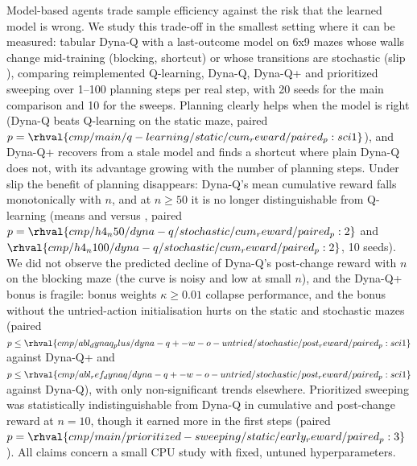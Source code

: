 Model-based agents trade sample efficiency against the risk that the learned model is wrong. We study this trade-off in the smallest setting where it can be measured: tabular Dyna-Q with a last-outcome model on 6x9 mazes whose walls change mid-training (blocking, shortcut) or whose transitions are stochastic (slip ), comparing reimplemented Q-learning, Dyna-Q, Dyna-Q+ and prioritized sweeping over 1--100 planning steps per real step, with 20 seeds for the main comparison and 10 for the sweeps. Planning clearly helps when the model is right (Dyna-Q beats Q-learning on the static maze, paired $p=\rhval{cmp/main/q-learning/static/cum_reward/paired_p:sci1}$), and Dyna-Q+ recovers from a stale model and finds a shortcut where plain Dyna-Q does not, with its advantage growing with the number of planning steps. Under slip  the benefit of planning disappears: Dyna-Q's mean cumulative reward falls monotonically with $n$, and at $n\ge50$ it is no longer distinguishable from Q-learning (means  and  versus , paired $p=\rhval{cmp/h4_n50/dyna-q/stochastic/cum_reward/paired_p:2}$ and $\rhval{cmp/h4_n100/dyna-q/stochastic/cum_reward/paired_p:2}$, 10 seeds). We did not observe the predicted decline of Dyna-Q's post-change reward with $n$ on the blocking maze (the curve is noisy and low at small $n$), and the Dyna-Q+ bonus is fragile: bonus weights $\kappa\ge 0.01$ collapse performance, and the bonus without the untried-action initialisation hurts on the static and stochastic mazes (paired $p\le\rhval{cmp/abl_dynaq_plus/dyna-q+-w-o-untried/stochastic/post_reward/paired_p:sci1}$ against Dyna-Q+ and $p\le\rhval{cmp/abl_ref_dynaq/dyna-q+-w-o-untried/stochastic/post_reward/paired_p:sci1}$ against Dyna-Q), with only non-significant trends elsewhere. Prioritized sweeping was statistically indistinguishable from Dyna-Q in cumulative and post-change reward at $n=10$, though it earned more in the first  steps (paired $p=\rhval{cmp/main/prioritized-sweeping/static/early_reward/paired_p:3}$). All claims concern a small CPU study with fixed, untuned hyperparameters.
